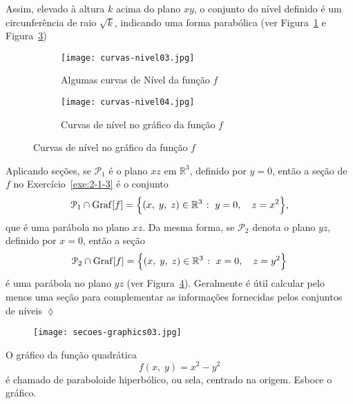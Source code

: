 Assim, elevado à altura \(k\) acima do plano \(xy\), o conjunto do nível definido é um circunferência  de raio \(\sqrt{k}\), indicando uma forma parabólica (ver Figura~\ref{fig:2-1-6} e 
Figura~\ref{fig:2-1-7}) 
%
\begin{figure}[H]
	\centering
	\begin{subfigure}[b]{0.45\textwidth}
		\centering
		\texttt{[image: curvas-nivel03.jpg]}
		\caption{Algumas curvas de Nível da função \(f\)}
		\label{fig:2-1-6}
	\end{subfigure}
	\hfill
	\begin{subfigure}[b]{0.45\textwidth}
		\centering
		\texttt{[image: curvas-nivel04.jpg]}
		\caption{Curvas de nível no gráfico da função \(f\)}
		\label{fig:2-1-7}
	\end{subfigure}
\end{figure}

Aplicando seções, se \(\mathcal{P}_{1}\) é o plano \(xz\) em \(\mathbb{R}^{3}\), definido por \(y = 0\), então a seção de \(f\) no Exercício~\ref{exe:2-1-3} é o conjunto
\begin{equation*}
	\mathcal{P}_{1} \cap \mathrm{Graf}[f] = \Bigl\{(x,\; y,\;  z)\in \mathbb{R}^{3}\; \colon \;  y = 0,\quad z=x^{2}\Bigr\},
\end{equation*}
que é uma parábola no plano \(xz\). Da mesma forma, se \(\mathcal{P}_{2}\) denota o plano \(yz\), definido por \(x=0\), então a seção
\begin{equation*}
	\mathcal{P}_{2} \cap \mathrm{Graf}[f] = \Bigl\{(x,\; y,\;  z)\in \mathbb{R}^{3}\; \colon \;  x = 0,\quad z = y^{2}\Bigr\}
\end{equation*}
é uma parábola no plano \(yz\) (ver Figura~\ref{fig:2-1-8}). Geralmente é útil calcular pelo menos uma seção para complementar as informações fornecidas pelos conjuntos de níveis
\hfill \(\lozenge\) 
%
\begin{figure}[H]
	\centering
	\texttt{[image: secoes-graphics03.jpg]}
	\caption{}
	\label{fig:2-1-8}
\end{figure}
%

\begin{exer}\label{exe:2-1-4}
	O gráfico da função quadrática
	\begin{equation*}
		f(x,\; y)=x^{2}-y^{2}
	\end{equation*}
	é chamado de paraboloide hiperbólico, ou sela, centrado na origem. Esboce o gráfico.
\end{exer}

